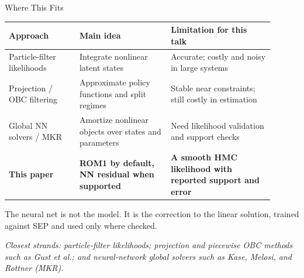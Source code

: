 \documentclass[aspectratio=169,10pt]{beamer}
\newcommand{\sourcefoot}[1]{%
  \vspace{-0.55em}
  \begin{flushleft}
  \parbox{0.96\linewidth}{\raggedright\tiny\textit{#1}}
  \end{flushleft}
}
\begin{document}
\begin{frame}{Where This Fits}
\footnotesize
\begin{table}
\centering
\begin{tabular}{@{}>{\raggedright\arraybackslash}p{0.24\linewidth}>{\raggedright\arraybackslash}p{0.31\linewidth}>{\raggedright\arraybackslash}p{0.35\linewidth}@{}}
\toprule
Approach & Main idea & Limitation for this talk \\
\midrule
Particle-filter likelihoods & Integrate nonlinear latent states & Accurate; costly and noisy in large systems \\
Projection / OBC filtering & Approximate policy functions and split regimes & Stable near constraints; still costly in estimation \\
Global NN solvers / MKR & Amortize nonlinear objects over states and parameters & Need likelihood validation and support checks \\
\textbf{This paper} & \textbf{ROM1 by default, NN residual when supported} & \textbf{A smooth HMC likelihood with reported support and error} \\
\bottomrule
\end{tabular}
\end{table}

\vspace{0.35em}
\begin{center}
\normalsize
The neural net is not the model. It is the correction to the linear solution, trained against SEP and used only where checked.
\end{center}

\sourcefoot{Closest strands: particle-filter likelihoods; projection and piecewise OBC methods such as Gust et al.; and neural-network global solvers such as Kase, Melosi, and Rottner (MKR).}
\end{frame}
\end{document}
